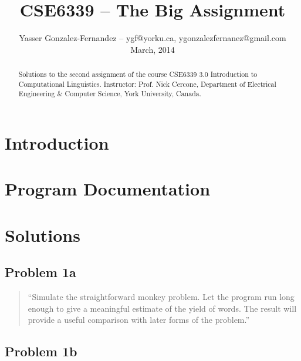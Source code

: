 \documentclass[conference]{IEEEtran}
\begin{document}
\title{CSE6339 -- The Big Assignment\vspace{-14pt}}
\author{Yasser Gonzalez-Fernandez -- ygf@yorku.ca, ygonzalezfernanez@gmail.com\vspace{4pt} \\ March, 2014}

\maketitle


\begin{abstract}
Solutions to the second assignment of the course CSE6339 3.0 Introduction to 
Computational Linguistics. Instructor: Prof. Nick Cercone, Department of 
Electrical Engineering \& Computer Science, York University, Canada.
\end{abstract}

\section{Introduction}


\section{Program Documentation}


\section{Solutions}

\subsection{Problem 1a}

\begin{quote}
``Simulate the straightforward monkey problem. Let the program run long enough to 
give a meaningful estimate of the yield of words. The result will provide a 
useful comparison with later forms of the problem.''
\end{quote}

\begin{framed}
\fontsize{5.65}{6.78}\selectfont

\end{framed}


\subsection{Problem 1b}
\end{document}

